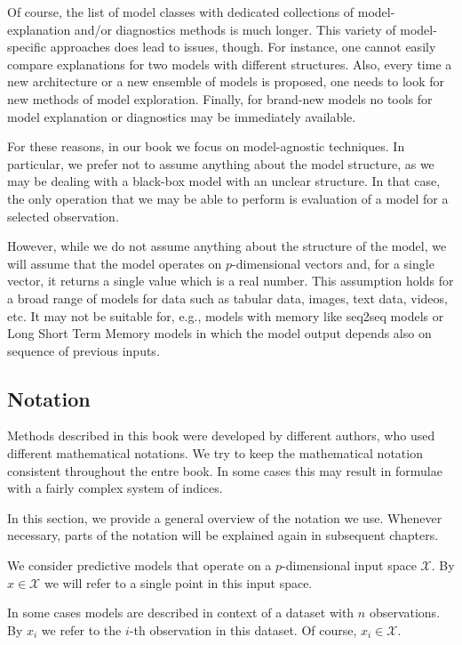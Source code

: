 \documentclass[12pt,]{krantz}
\begin{document}
Of course, the list of model classes with dedicated collections of model-explanation and/or diagnostics methods is much longer. This variety of model-specific approaches does lead to issues, though. For instance, one cannot easily compare explanations for two models with different structures. Also, every time a new architecture or a new ensemble of models is proposed, one needs to look for new methods of model exploration. Finally, for brand-new models no tools for model explanation or diagnostics may be immediately available.

For these reasons, in our book we focus on model-agnostic techniques. In particular, we prefer not to assume anything about the model structure, as we may be dealing with a black-box model with an unclear structure. In that case, the only operation that we may be able to perform is evaluation of a model for a selected observation.

However, while we do not assume anything about the structure of the model, we will assume that the model operates on \(p\)-dimensional vectors and, for a single vector, it returns a single value which is a real number. This assumption holds for a broad range of models for data such as tabular data, images, text data, videos, etc. It may not be suitable for, e.g., models with memory like seq2seq models \citep{seq2seq} or Long Short Term Memory models \citep{lstm} in which the model output depends also on sequence of previous inputs.

\hypertarget{notation}{%
\subsection{Notation}\label{notation}}

Methods described in this book were developed by different authors, who used different mathematical notations.
We try to keep the mathematical notation consistent throughout the entre book. In some cases this may result in formulae with a fairly complex system of indices.

In this section, we provide a general overview of the notation we use. Whenever necessary, parts of the notation will be explained again in subsequent chapters.

We consider predictive models that operate on a \(p\)-dimensional input space \(\mathcal X\). By \(x \in \mathcal X\) we will refer to a single point in this input space.

In some cases models are described in context of a dataset with \(n\) observations. By \(x_i\) we refer to the \(i\)-th observation in this dataset. Of course, \(x_i \in \mathcal X\).
\end{document}
